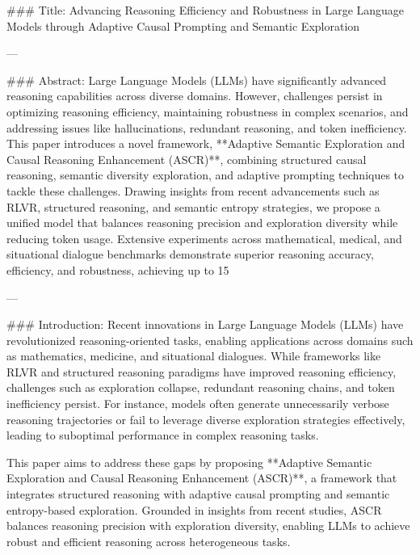 ### Title: Advancing Reasoning Efficiency and Robustness in Large Language Models through Adaptive Causal Prompting and Semantic Exploration

---

### Abstract:
Large Language Models (LLMs) have significantly advanced reasoning capabilities across diverse domains. However, challenges persist in optimizing reasoning efficiency, maintaining robustness in complex scenarios, and addressing issues like hallucinations, redundant reasoning, and token inefficiency. This paper introduces a novel framework, **Adaptive Semantic Exploration and Causal Reasoning Enhancement (ASCR)**, combining structured causal reasoning, semantic diversity exploration, and adaptive prompting techniques to tackle these challenges. Drawing insights from recent advancements such as RLVR, structured reasoning, and semantic entropy strategies, we propose a unified model that balances reasoning precision and exploration diversity while reducing token usage. Extensive experiments across mathematical, medical, and situational dialogue benchmarks demonstrate superior reasoning accuracy, efficiency, and robustness, achieving up to 15%

---

### Introduction:
Recent innovations in Large Language Models (LLMs) have revolutionized reasoning-oriented tasks, enabling applications across domains such as mathematics, medicine, and situational dialogues. While frameworks like RLVR and structured reasoning paradigms have improved reasoning efficiency, challenges such as exploration collapse, redundant reasoning chains, and token inefficiency persist. For instance, models often generate unnecessarily verbose reasoning trajectories or fail to leverage diverse exploration strategies effectively, leading to suboptimal performance in complex reasoning tasks.

This paper aims to address these gaps by proposing **Adaptive Semantic Exploration and Causal Reasoning Enhancement (ASCR)**, a framework that integrates structured reasoning with adaptive causal prompting and semantic entropy-based exploration. Grounded in insights from recent studies, ASCR balances reasoning precision with exploration diversity, enabling LLMs to achieve robust and efficient reasoning across heterogeneous tasks.

